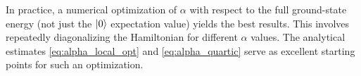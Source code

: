 \begin{remark}
In practice, a numerical optimization of $\alpha$ with respect to the full
ground-state energy (not just the $\ket{0}$ expectation value) yields the best results.
This involves repeatedly diagonalizing the Hamiltonian for different $\alpha$ values.
The analytical estimates \eqref{eq:alpha_local_opt} and \eqref{eq:alpha_quartic}
serve as excellent starting points for such an optimization.
\end{remark}

